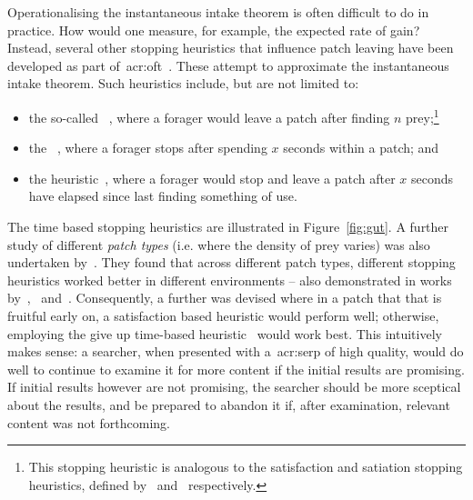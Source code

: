 Operationalising the instantaneous intake theorem is often difficult to do in practice. How would one measure, for example, the expected rate of gain? Instead, several other stopping heuristics that influence patch leaving have been developed as part of~\gls{acr:oft}~\citep{stephens1986foraging_theory}. These attempt to approximate the instantaneous intake theorem. Such heuristics include, but are not limited to:

\begin{itemize}
    \item{the so-called ~\citep{gibb1958number_rule}, where a forager would leave a patch after finding $n$ prey;\footnote{This stopping heuristic is analogous to the satisfaction and satiation stopping heuristics, defined by~\cite{cooper1973retrieval_effectiveness} and~\cite{simon1955satiation} respectively.}}
    
    \item{the ~\citep{charles1972behaviour, krebs1973time_rule}, where a forager stops after spending $x$ seconds within a patch; and}
    
    \item{the  heuristic~\citep{krebs1974leave_after_rule}, where a forager would stop and leave a patch after $x$ seconds have elapsed since last finding something of use.}
\end{itemize}

The time based stopping heuristics are illustrated in Figure~\ref{fig:gut}. A further study of different \emph{patch types} (i.e. where the density of prey varies) was also undertaken by~\cite{mcnair1982gut_mvt}. They found that across different patch types, different stopping heuristics worked better in different environments -- also demonstrated in works by~\cite{iwasa1981prey_distribution},~\cite{mcnair1982gut_mvt} and~\cite{green1984oft_stopping}. Consequently, a further  was devised where in a patch that that is fruitful early on, a satisfaction based heuristic would perform well; otherwise, employing the give up time-based heuristic~\citep{krebs1974leave_after_rule} would work best. This intuitively makes sense: a searcher, when presented with a~\gls{acr:serp} of high quality, would do well to continue to examine it for more content if the initial results are promising. If initial results however are not promising, the searcher should be more sceptical about the results, and be prepared to abandon it if, after examination, relevant content was not forthcoming.

